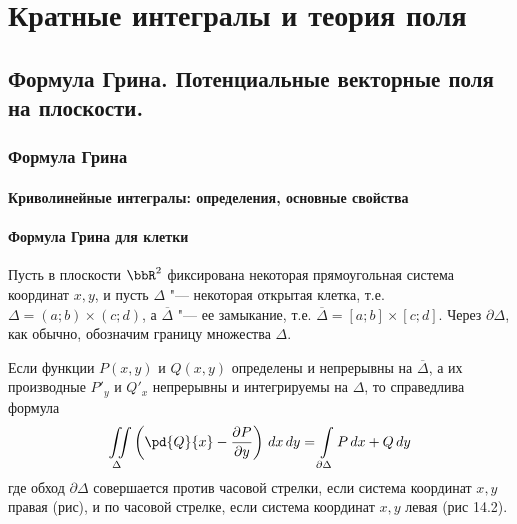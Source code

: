 \part[Кратные интегралы и теория поля]{Кратные интегралы и теория поля}%

\chapter{Формула Грина. Потенциальные векторные поля на плоскости.}
\section{Формула Грина} 

\subsection{Криволинейные интегралы: определения, основные свойства}

\subsection{Формула Грина для клетки}

Пусть в плоскости $\bbR^2$ фиксирована некоторая прямоугольная система координат $x,y$, и пусть $\Delta$ "--- некоторая открытая клетка, т.е. $\Delta = (a;b)\times(c;d)$, а $\overline{\Delta}$ "--- ее замыкание, т.е. $\overline{\Delta}=[a;b]\times[c;d]$. Через $\partial \Delta$, как обычно, обозначим границу множества $\Delta$.


\begin{lemm}
Если функции $P(x,y)$ и $Q(x,y)$ определены и непрерывны на $\overline{\Delta}$, а их производные $P'_y$ и $Q'_x$ непрерывны и интегрируемы на $\Delta$, то справедлива формула
\begin{equation} \label{Grin}
\iint\limits_{\Delta} \left( \pd{Q}{x}-\frac{\partial P}{\partial y} \right)\,dx\,dy = \int\limits_{\partial \Delta} P\,dx + Q\,dy
\end{equation}
где обход $\partial\Delta$ совершается против часовой стрелки, если система координат $x,y$ правая (рис), и по часовой стрелке, если система координат $x,y$ левая (рис 14.2).
\end{lemm}


